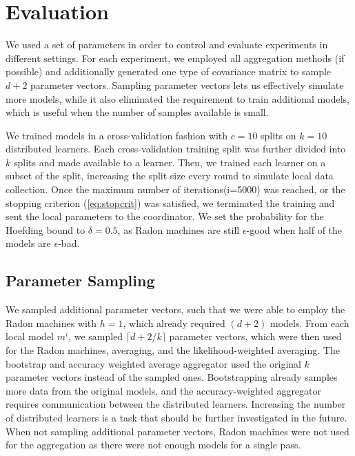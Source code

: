 \section{Evaluation}
\label{sec:experiments}
We used a set of parameters in order to control and evaluate experiments in different settings.
For each experiment, we employed all aggregation methods (if possible) and additionally generated one type of covariance matrix to sample $d+2$ parameter vectors. 
Sampling parameter vectors lets us effectively simulate more models, while it also eliminated the requirement to train additional models, which is useful when the number of samples available is small.

We trained models in a cross-validation fashion with $c = 10$ splits on $k=10$ distributed learners.
Each cross-validation training split was further divided into $k$ splits and made available to a learner.
Then, we trained each learner on a subset of the split, increasing the split size every round to simulate local data collection.
Once the maximum number of iterations(i=5000) was reached, or the stopping criterion (\autoref{eq:stopcrit}) was satisfied, we terminated the training and sent the local parameters to the coordinator.
We set the probability for the Hoefding bound to $\delta = 0.5$, as Radon machines are still $\epsilon$-good when half of the models are $\epsilon$-bad.

\subsection{Parameter Sampling}
We sampled additional parameter vectors, such that we were able to employ the Radon machines with $h=1$, which already required $(d+2)$ models.
From each local model $m^i$, we sampled $\lceil d+2/k \rceil$ parameter vectors, which were then used for the Radon machines, averaging, and the likelihood-weighted averaging.
The bootstrap and accuracy weighted average aggregator used the original $k$ parameter vectors instead of the sampled ones.
Bootstrapping already samples more data from the original models, and the accuracy-weighted aggregator requires communication between the distributed learners.
Increasing the number of distributed learners is a task that should be further investigated in the future.
When not sampling additional parameter vectors, Radon machines were not used for the aggregation as there were not enough models for a single pass.


